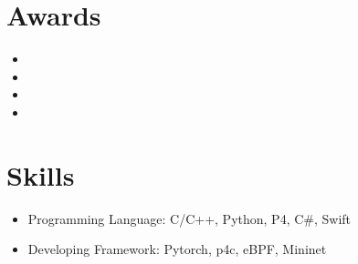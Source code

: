 \documentclass{resume}
\begin{document}

\section{Awards}

\begin{itemize}[parsep=0.5ex]
  \item {}
  \item {}
  \item {}
  \item {}
\end{itemize}

\section{Skills}

\begin{itemize}[parsep=0.5ex]
  \item Programming Language: C/C++, Python, P4, C\#, Swift
  \item Developing Framework: Pytorch, p4c, eBPF, Mininet
\end{itemize}


\end{document}
